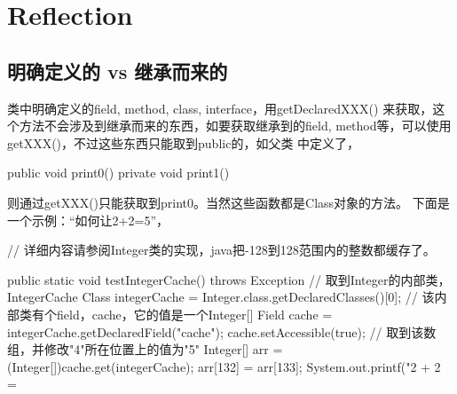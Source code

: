 ﻿\section[Reflection]{Reflection}

\subsection[明确定义的 vs 继承而来的]{明确定义的 vs 继承而来的}
类中明确定义的field, method, class, interface，用getDeclaredXXX()
来获取，这个方法不会涉及到继承而来的东西，如要获取继承到的field,
method等，可以使用getXXX()，不过这些东西只能取到public的，如父类
中定义了，

\begin{javacode}
public void print0() { }
private void print1() { }
\end{javacode}

则通过getXXX()只能获取到print0。当然这些函数都是Class对象的方法。
下面是一个示例：“如何让2+2=5”，

\begin{javacode}
// 详细内容请参阅Integer类的实现，java把-128到128范围内的整数都缓存了。

public static void testIntegerCache() throws Exception {
  // 取到Integer的内部类，IntegerCache
  Class integerCache = Integer.class.getDeclaredClasses()[0];
  // 该内部类有个field，cache，它的值是一个Integer[]
  Field cache = integerCache.getDeclaredField("cache");
  cache.setAccessible(true);
  // 取到该数组，并修改"4"所在位置上的值为"5"
  Integer[] arr = (Integer[])cache.get(integerCache);
  arr[132] = arr[133];
  System.out.printf("2 + 2 = %
}
\end{javacode}